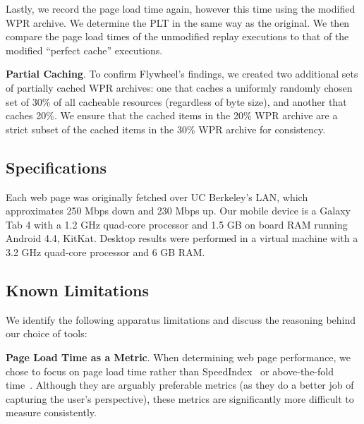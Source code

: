 Lastly, we record the page load time again, however this time using the modified WPR archive. We determine the PLT in the same way as the original. We then compare the page load times of the unmodified replay executions to that of the modified ``perfect cache'' executions.

\textbf{Partial Caching}. To confirm Flywheel's findings, we created two additional sets of partially cached WPR archives: one that caches a uniformly randomly chosen set of 30\% of all cacheable resources (regardless of byte size), and another that caches 20\%.
We ensure that the cached items in the 20\% WPR archive are a strict subset of the cached items in the 30\% WPR archive for consistency. 
\subsection{Specifications} \label{specs}
Each web page was originally fetched over UC Berkeley's LAN, which approximates 250 Mbps down and 230 Mbps up.
Our mobile device is a Galaxy Tab 4 with a 1.2 GHz quad-core processor and 1.5 GB on board RAM running Android 4.4, KitKat. Desktop results were performed in a virtual machine with a 3.2 GHz quad-core processor and 6 GB RAM.
\subsection{Known Limitations}  \label{known_limitations}
We identify the following apparatus limitations and discuss the reasoning behind our choice of tools:

\textbf{Page Load Time as a Metric}. When determining web page performance, we chose to focus on page load time rather than SpeedIndex~\cite{speed-index} or above-the-fold time~\cite{above-the-fold}.
Although they are arguably preferable metrics (as they do a better job of capturing the user's perspective), these metrics are significantly more difficult to measure consistently.

